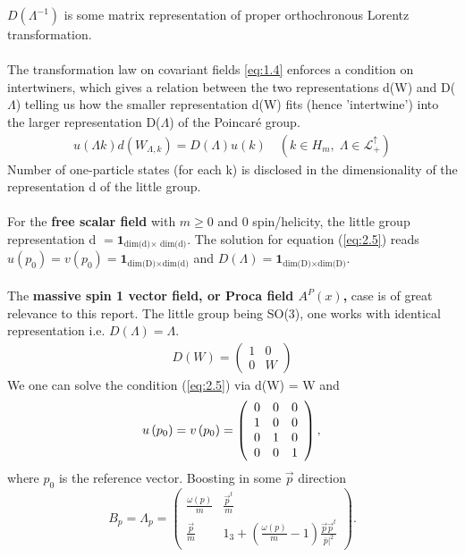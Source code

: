 \documentclass[12pt,a4paper]{article}
\numberwithin{equation}{section}
\begin{document}
$D(\Lambda^{-1})$ is some matrix representation of proper orthochronous Lorentz transformation.\\\\ 
The transformation law on covariant fields \eqref{eq:1.4} enforces a condition on intertwiners, which gives a relation between the two representations d(W) and D($\Lambda$)  telling us how the smaller representation d(W) fits (hence 'intertwine') into the larger representation D($\Lambda$) of the Poincar{\'e} group. 
\begin{align}\label{eq:2.5}
u(\Lambda k)d(W_{\Lambda,k})=D(\Lambda)u(k)\quad (k\in H_m,\; \Lambda\in\mathcal{L}^\uparrow_+)
\end{align}
Number of one-particle states (for each k) is disclosed in the dimensionality of the representation d of the little group.\\\\
For the \textbf{\textcolor{blue!50!black}{free scalar field}} with $m\geq0$ and 0 spin/helicity, the little group representation d $=\boldsymbol{1}_{\text{dim(d)$\times$ dim(d)}}$. The solution for equation (\ref{eq:2.5}) reads $u(p_0)=v(p_0)=\boldsymbol{1}_{\text{dim(D)$\times$dim(d)}}$ and $D(\Lambda)=\boldsymbol{1}_{\text{dim(D)$\times$dim(D)}}$. \\\\
The \textbf{\textcolor{blue!50!black}{massive spin 1 vector field, or Proca field $A^P(x)$,}} case is of great relevance to this report. The little group being SO(3), one works with identical representation i.e. $D(\Lambda)=\Lambda$.
\begin{align*}
D(W)=\begin{pmatrix}
1&0\\
0&W
\end{pmatrix}
\end{align*}  
We one can solve the condition (\ref{eq:2.5}) via d(W) = W and $$
u\left(p_{0}\right)=v\left(p_{0}\right)=\left(\begin{array}{ccc}
0 & 0 & 0 \\
1 & 0 & 0 \\
0 & 1 & 0 \\
0 & 0 & 1
\end{array}\right),\\ $$
where $p_0$ is the reference vector. Boosting in some $\vec{p}$ direction 
$$ B_{p}=\Lambda_{p}=\left(\begin{array}{cc}
\frac{\omega(p)}{m} & \frac{\vec{p}^{t}}{m} \\
\frac{\vec{p}}{m} & 1_{3}+\left(\frac{\omega(p)}{m}-1\right) \frac{\vec{p} \vec{p}^{t}}{\left.\bar{p}\right|^{2}}
\end{array}\right).
$$
\end{document}
